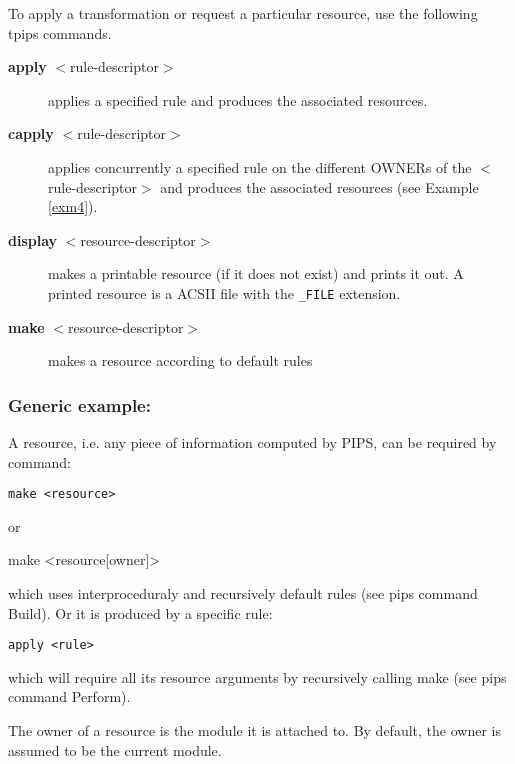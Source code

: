 \documentclass[a4paper,12pt]{article}
\begin{document}
To apply a transformation or request a particular resource, use the
following tpips commands. 
\begin{description}

\item [ {\bf apply} $<$rule-descriptor$>$] applies a specified rule and
  produces the associated resources.
        
\item [{\bf capply} $<$rule-descriptor$>$] applies concurrently a specified
  rule on the different OWNERs of the $<$rule-descriptor$>$ and produces the
  associated resources (see Example \ref{exm4}).
  

\item [ {\bf display} $<$resource-descriptor$>$] makes a printable resource
  (if it does not exist) and prints it out. A printed resource is a ACSII
  file with the \verb+_FILE+ extension.
  

  
\item [ {\bf make} $<$resource-descriptor$>$] makes a resource according to
  default rules
  

\end{description}

\subsubsection*{Generic example:}

A resource, i.e. any piece of information computed by PIPS,
can be required by command:

{\bf
\begin{verbatim}
make <resource>
\end{verbatim}
}

or

{\bf
\begin{verbatim*}
make <resource[owner]>
\end{verbatim*}
}

which uses interproceduraly and recursively default rules
(see pips command Build). Or it is produced by a specific
rule:
{\bf
\begin{verbatim}
apply <rule>
\end{verbatim}
}

which will require all its resource arguments by recursively
calling make (see pips command Perform).

The owner of a resource is the module it is attached to. By
default, the owner is assumed to be the current module.
\end{document}
